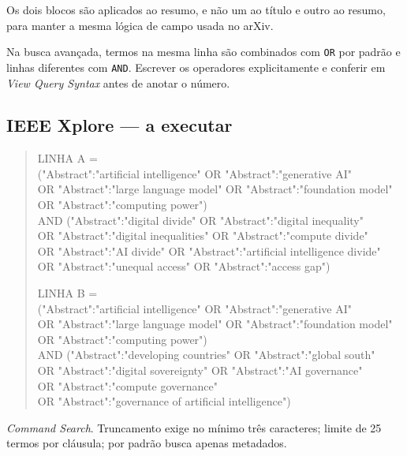 \documentclass[12pt,a4paper]{article}
\begin{document}
\noindent Os dois blocos são aplicados ao resumo, e não um ao título e outro ao resumo,
para manter a mesma lógica de campo usada no arXiv.

\noindent Na busca avançada, termos na mesma linha são combinados com \texttt{OR} por
padrão e linhas diferentes com \texttt{AND}. Escrever os operadores explicitamente e
conferir em \textit{View Query Syntax} antes de anotar o número.

\subsection{IEEE Xplore --- a executar}

\begin{quote}\scriptsize\ttfamily
LINHA A =\\
("Abstract":"artificial intelligence" OR "Abstract":"generative AI"\\
 OR "Abstract":"large language model" OR "Abstract":"foundation model"\\
 OR "Abstract":"computing power")\\
AND ("Abstract":"digital divide" OR "Abstract":"digital inequality"\\
 OR "Abstract":"digital inequalities" OR "Abstract":"compute divide"\\
 OR "Abstract":"AI divide" OR "Abstract":"artificial intelligence divide"\\
 OR "Abstract":"unequal access" OR "Abstract":"access gap")

\vspace{0.6em}
LINHA B =\\
("Abstract":"artificial intelligence" OR "Abstract":"generative AI"\\
 OR "Abstract":"large language model" OR "Abstract":"foundation model"\\
 OR "Abstract":"computing power")\\
AND ("Abstract":"developing countries" OR "Abstract":"global south"\\
 OR "Abstract":"digital sovereignty" OR "Abstract":"AI governance"\\
 OR "Abstract":"compute governance"\\
 OR "Abstract":"governance of artificial intelligence")
\end{quote}

\noindent \textit{Command Search}. Truncamento exige no mínimo três caracteres; limite de
25 termos por cláusula; por padrão busca apenas metadados.
\end{document}

